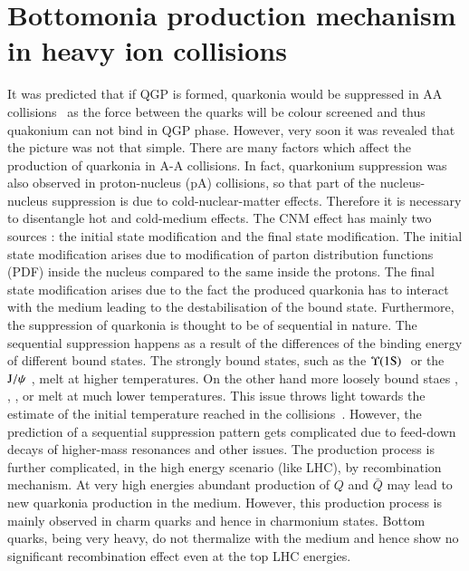 \section{Bottomonia production mechanism in heavy ion collisions}
\label{sec:Bottomonia_hi}


It was predicted that if QGP is formed, quarkonia would be suppressed in
AA collisions~\cite{Matsui:1986dk} as the force between the quarks
will be colour screened and thus quakonium can not bind in QGP phase.
 However, very soon it was revealed that the picture was not that simple.
There are many factors which affect the production of quarkonia in A-A collisions. 
In fact, quarkonium suppression was also observed in proton-nucleus (pA)
collisions, so that part of the nucleus-nucleus suppression is due to 
cold-nuclear-matter effects. Therefore it is necessary to disentangle hot 
and cold-medium effects. The CNM effect has mainly two sources : the initial
state modification and the final state modification. The initial state modification
arises due to modification of parton distribution functions (PDF) inside the nucleus
compared to the same inside the protons. The final state modification 
arises due to the  fact the produced quarkonia has to interact with the medium
leading to the destabilisation of the bound state. Furthermore, the suppression of
quarkonia is thought to be of sequential in nature.  The sequential suppression
happens as a result of the differences of the  binding energy of different bound states. 
The strongly bound states, such as the $\Upsilon\mathrm{(1S)}\hspace {0.05in}$ or the $\mathrm{J}/\psi\hspace {0.05in}$,  melt at higher 
temperatures. On the other hand  more loosely bound staes \psiP, \chic, \chib, 
\upsb or \upsc  melt at much lower temperatures.  This issue throws light towards the 
 estimate of the initial temperature reached in 
the collisions~\cite{Digal:2001ue}. However, the prediction of a sequential 
suppression pattern gets complicated due to feed-down 
decays of higher-mass resonances and other issues. The production process is further 
complicated, in the high energy scenario (like LHC), by recombination mechanism. At very 
high energies abundant production of $Q$ and $\bar Q$ may lead to new quarkonia production 
in the medium. However, this production process is mainly observed in charm quarks and hence in
charmonium states. Bottom quarks, being very heavy, do not thermalize with the medium and
hence show no significant
recombination effect even at the top LHC energies.   




